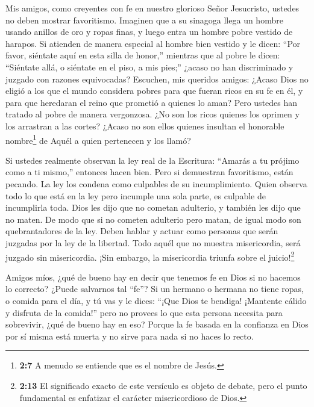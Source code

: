  Mis amigos, como creyentes con fe en nuestro glorioso Señor
Jesucristo, ustedes no deben mostrar favoritismo.  Imaginen
que a su sinagoga llega un hombre usando anillos de oro y ropas finas, y
luego entra un hombre pobre vestido de harapos.  Si atienden
de manera especial al hombre bien vestido y le dicen: ``Por favor,
siéntate aquí en esta silla de honor,'' mientras que al pobre le dicen:
``Siéntate allá, o siéntate en el piso, a mis pies;'' 
¿acaso no han discriminado y juzgado con razones equivocadas?
 Escuchen, mis queridos amigos: ¿Acaso Dios no eligió a los
que el mundo considera pobres para que fueran ricos en su fe en él, y
para que heredaran el reino que prometió a quienes lo aman? 
Pero ustedes han tratado al pobre de manera vergonzosa. ¿No son los
ricos quienes los oprimen y los arrastran a las cortes? 
¿Acaso no son ellos quienes insultan el honorable nombre\footnote{\textbf{2:7}
  A menudo se entiende que es el nombre de Jesús.} de Aquél a quien
pertenecen y los llamó?

 Si ustedes realmente observan la ley real de la Escritura:
``Amarás a tu prójimo como a ti mismo,'' entonces hacen bien.
 Pero si demuestran favoritismo, están pecando. La ley los
condena como culpables de su incumplimiento.  Quien observa
todo lo que está en la ley pero incumple una sola parte, es culpable de
incumplirla toda.  Dios les dijo que no cometan adulterio,
y también les dijo que no maten. De modo que si no cometen adulterio
pero matan, de igual modo son quebrantadores de la ley. 
Deben hablar y actuar como personas que serán juzgadas por la ley de la
libertad.  Todo aquél que no muestra misericordia, será
juzgado sin misericordia. ¡Sin embargo, la misericordia triunfa sobre el
juicio!\footnote{\textbf{2:13} El significado exacto de este versículo
  es objeto de debate, pero el punto fundamental es enfatizar el
  carácter misericordioso de Dios.}

 Amigos míos, ¿qué de bueno hay en decir que tenemos fe en
Dios si no hacemos lo correcto? ¿Puede salvarnos tal ``fe''?
 Si un hermano o hermana no tiene ropas, o comida para el
día,  y tú vas y le dices: ``¡Que Dios te bendiga!
¡Mantente cálido y disfruta de la comida!'' pero no provees lo que esta
persona necesita para sobrevivir, ¿qué de bueno hay en eso?
 Porque la fe basada en la confianza en Dios por sí misma
está muerta y no sirve para nada si no haces lo recto.

